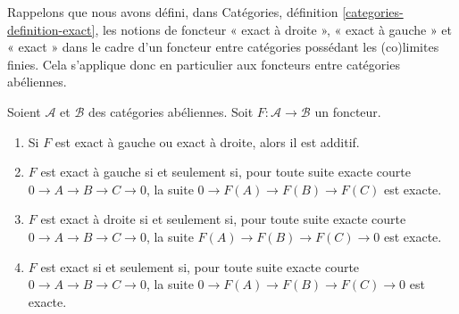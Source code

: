 \noindent
Rappelons que nous avons défini, dans
Catégories, définition \ref{categories-definition-exact},
les notions de foncteur « exact à droite », « exact à gauche » et
« exact » dans le cadre d'un foncteur entre
catégories possédant les (co)limites finies. Cela
s'applique donc en particulier aux foncteurs entre catégories
abéliennes.

\begin{lemma}
\label{lemma-exact-functor}
Soient $\mathcal{A}$ et $\mathcal{B}$ des catégories abéliennes.
Soit $F : \mathcal{A} \to \mathcal{B}$ un foncteur.
\begin{enumerate}
\item Si $F$ est exact à gauche ou exact à droite, alors il est additif.
\item $F$ est exact à gauche si et seulement si,
pour toute suite exacte courte
$0 \to A \to B \to C \to 0$,
la suite $0 \to F(A) \to F(B) \to F(C)$
est exacte.
\item $F$ est exact à droite si et seulement si, pour toute suite exacte courte
$0 \to A \to B \to C \to 0$,
la suite $F(A) \to F(B) \to F(C) \to 0$
est exacte.
\item $F$ est exact si et seulement si, pour toute suite exacte courte
$0 \to A \to B \to C \to 0$,
la suite $0 \to F(A) \to F(B) \to F(C) \to 0$
est exacte.
\end{enumerate}
\end{lemma}


